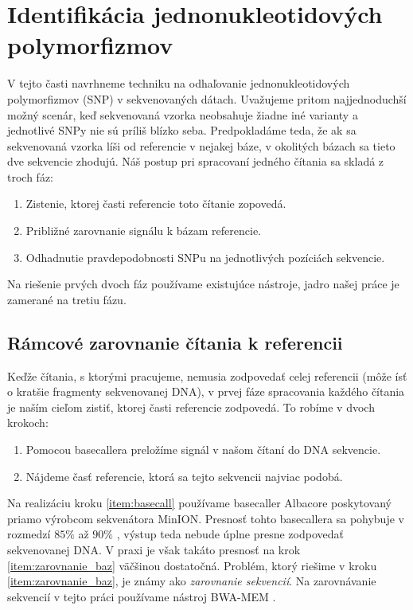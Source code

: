 \chapter{Identifikácia jednonukleotidových polymorfizmov}

\label{kap:identifikacia_SNP} 

V tejto časti navrhneme techniku na odhaľovanie jednonukleotidových
polymorfizmov (SNP) v sekvenovaných dátach. Uvažujeme pritom najjednoduchší
možný scenár, keď sekvenovaná vzorka neobsahuje žiadne iné varianty a jednotlivé
SNPy nie sú príliš blízko seba. Predpokladáme teda, že ak sa sekvenovaná vzorka 
líši od referencie v nejakej báze, v okolitých bázach sa tieto dve sekvencie
zhodujú. Náš postup pri spracovaní jedného čítania sa skladá z troch fáz:

\begin{enumerate}
\item Zistenie, ktorej časti referencie toto čítanie zopovedá.
\item Približné zarovnanie signálu k bázam referencie.
\item Odhadnutie pravdepodobnosti SNPu na jednotlivých pozíciách sekvencie.
\end{enumerate}

Na riešenie prvých dvoch fáz používame existujúce nástroje, jadro našej práce je
zamerané na tretiu fázu.

\section{Rámcové zarovnanie čítania k referencii}
\label{ramcove_zarovnanie}
Keďže čítania, s ktorými pracujeme, nemusia zodpovedať celej referencii (môže ísť o
kratšie fragmenty sekvenovanej DNA), v prvej fáze spracovania každého čítania
je naším cieľom zistiť, ktorej časti referencie zodpovedá. To robíme v dvoch krokoch:

\begin{enumerate}
\item \label{item:basecall} Pomocou basecallera preložíme signál v našom čítaní do DNA sekvencie.
\item \label{item:zarovnanie_baz} Nájdeme časť referencie, ktorá sa tejto sekvencii najviac podobá.
\end{enumerate}

Na realizáciu kroku \ref{item:basecall} používame basecaller Albacore poskytovaný priamo výrobcom sekvenátora MinION.
Presnosť tohto basecallera sa pohybuje v rozmedzí $85\%$ až $90\%$ \cite{BasecallerComparison},
výstup teda nebude úplne presne zodpovedať sekvenovanej
DNA. V praxi je však takáto presnosť na krok \ref{item:zarovnanie_baz} väčšinou dostatočná.
Problém, ktorý riešime v kroku \ref{item:zarovnanie_baz}, je známy ako
\emph{zarovnanie sekvencií}. Na zarovnávanie sekvencií v tejto práci používame
nástroj BWA-MEM \cite{BWA-MEM}.

